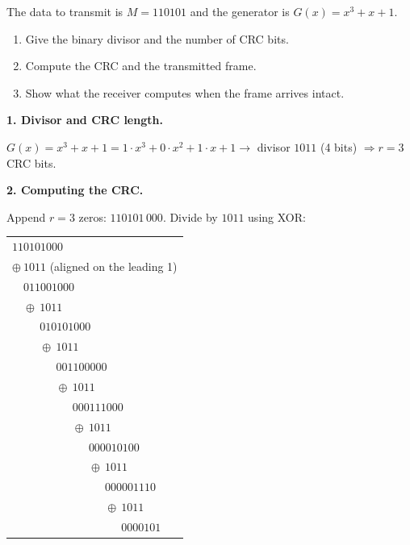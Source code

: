 \documentclass[11pt]{article}
\begin{document}
\begin{exoresolu}
The data to transmit is $M = 110101$ and the generator is $G(x) = x^3 + x + 1$.
\begin{enumerate}
\item Give the binary divisor and the number of CRC bits.
\item Compute the CRC and the transmitted frame.
\item Show what the receiver computes when the frame arrives intact.
\end{enumerate}
\tcblower
\textbf{1. Divisor and CRC length.}\par
$G(x) = x^3 + x + 1 = 1\cdot x^3 + 0\cdot x^2 + 1\cdot x + 1 \rightarrow$ divisor $1011$ (4 bits) $\Rightarrow r = 3$ CRC bits.\par\smallskip
\textbf{2. Computing the CRC.}\par
Append $r = 3$ zeros: $110101\,000$. Divide by $1011$ using XOR:\par
\begin{center}
\begin{tabular}{l}
$110101000$ \\
$\oplus\ 1011$ \quad (aligned on the leading 1) \\
\hline
$\phantom{\oplus\ }011001000$ \\
$\phantom{\oplus\ }\oplus\ 1011$ \\
\hline
$\phantom{\oplus\ \oplus\ }010101000$ \\
$\phantom{\oplus\ \oplus\ }\oplus\ 1011$ \\
\hline
$\phantom{\oplus\ \oplus\ \oplus\ }001100000$ \\
$\phantom{\oplus\ \oplus\ \oplus\ }\oplus\ 1011$ \\
\hline
$\phantom{\oplus\ \oplus\ \oplus\ \oplus\ }000111000$ \\
$\phantom{\oplus\ \oplus\ \oplus\ \oplus\ }\oplus\ 1011$ \\
\hline
$\phantom{\oplus\ \oplus\ \oplus\ \oplus\ \oplus\ }000010100$ \\
$\phantom{\oplus\ \oplus\ \oplus\ \oplus\ \oplus\ }\oplus\ 1011$ \\
\hline
$\phantom{\oplus\ \oplus\ \oplus\ \oplus\ \oplus\ \oplus\ }000001110$ \\
$\phantom{\oplus\ \oplus\ \oplus\ \oplus\ \oplus\ \oplus\ }\oplus\ 1011$ \\
\hline
$\phantom{\oplus\ \oplus\ \oplus\ \oplus\ \oplus\ \oplus\ \oplus\ }0000101$ \\
\end{tabular}

\end{center}
\end{exoresolu}
\end{document}
